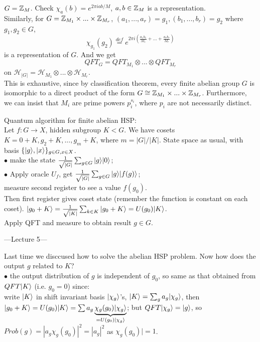 \documentclass[a4paper]{article}
\begin{document}
\begin{eg}
    $G=\mathbb{Z}_M$. Check $\chi_a(b) = e^{2\pi iab/M}$, $a,b \in \mathbb{Z}_M$ is a representation.\\
    Similarly, for $G=\mathbb{Z}_{M_1} \times ... \times \mathbb{Z}_{M_r}$, $(a_1,...,a_r) = g_1, (b_1,...,b_r) = g_2$ where $g_1,g_2 \in G$, $$\chi_{g_1}(g_2) \stackrel{def}{=} e^{2\pi i \left(\frac{a_1b_1}{M_1} + ... + \frac{a_rb_r}{M_r}\right)}$$ is a representation of $G$. And we get $$QFT_G =QFT_{M_1} \otimes ... \otimes QFT_{M_r}$$ on $\mathcal{H}_{|G|} = \mathcal{H}_{M_1} \otimes ... \otimes \mathcal{H}_{M_r}$.\\
    This is exhaustive, since by classification theorem, every finite abelian group $G$ is isomorphic to a direct product of the form $G \cong \mathbb{Z}_{M_1} \times ... \times \mathbb{Z}_{M_r}$. Furthermore, we can insist that $M_i$ are prime powers $p_i^{s_i}$, where $p_i$ are not necessarily distinct.
\end{eg}

Quantum algorithm for finite abelian HSP:\\
Let $f:G \to X$, hidden subgroup $K<G$. We have cosets $K=0+K,g_2+K,...,g_m+K$, where $m=|G|/|K|$. State space as usual, with basis $\{|g\rangle, |x\rangle \}_{g \in G, x \in X}$.\\
$\bullet$ make the state $\frac{1}{\sqrt{|G|}} \sum_{g \in G} |g\rangle |0\rangle$;\\
$\bullet$ Apply oracle $U_f$, get $\frac{1}{\sqrt{|G|}} \sum_{g \in G} |g\rangle |f(g)\rangle$;\\
measure second register to see a value $f(g_0)$.\\
Then first register gives coset state (remember the function is constant on each coset). $|g_0+K \rangle = \frac{1}{\sqrt{|K|}} \sum_{k \in K} |g_0 + K \rangle = U(g_0) |K\rangle$.\\
Apply QFT and measure to obtain result $g \in G$.

---Lecture 5---

Last time we disccused how to solve the abelian HSP problem. Now how does the output $g$ related to $K$?\\
$\bullet$ the output distribution of $g$ is independent of $g_0$, so same as that obtained from $QFT|K \rangle$ (i.e. $g_0 = 0$) since:\\
write $|K \rangle $ in shift invariant basis $|\chi_g \rangle$'s, $|K\rangle = \sum_{g} a_g | \chi_g \rangle$, then $|g_0+K \rangle = U(g_0) |K\rangle = \sum a_g \underbrace{\chi_g(g_0) | \chi_g \rangle}_{ = U(g_0) | \chi_g \rangle}$; but $QFT|\chi_g \rangle = |g\rangle$, so $Prob(g) = |a_g \chi_g (g_0)|^2 = |a_g|^2$ as $\chi_g(g_0)| = 1$.
\end{document}
